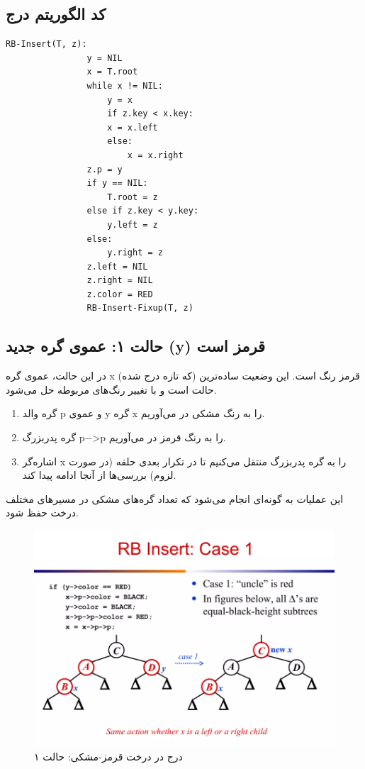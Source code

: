 \documentclass[a4paper,12pt]{article}
\begin{document}
	\subsection*{کد الگوریتم درج}
	
	\begin{LTR}
		\begin{lstlisting}[caption={Red-Black Tree Insertion}, label={lst:rb-insert}]
			RB-Insert(T, z):
				y = NIL
				x = T.root
				while x != NIL:
					y = x
					if z.key < x.key:
					x = x.left
					else:
						x = x.right
				z.p = y
				if y == NIL:
					T.root = z
				else if z.key < y.key:
					y.left = z
				else:
					y.right = z
				z.left = NIL
				z.right = NIL
				z.color = RED
				RB-Insert-Fixup(T, z)
		\end{lstlisting}
	\end{LTR}
	
			\subsection*{حالت ۱: عموی گره جدید (y) قرمز است}
		
		
		در این حالت، عموی گره 
		x
		(که تازه درج شده) قرمز رنگ است. این وضعیت ساده‌ترین حالت است و با تغییر رنگ‌های مربوطه حل می‌شود.
		
		\begin{enumerate}
			\item گره والد 
			p
			و عموی 
			y
			گره 
			x
			را به رنگ مشکی در می‌آوریم.
			\item گره پدربزرگ 
			p−>p
			را به رنگ قرمز در می‌آوریم.
			\item اشاره‌گر 
			x
			را به گره پدربزرگ منتقل می‌کنیم تا در تکرار بعدی حلقه (در صورت لزوم) بررسی‌ها از آنجا ادامه پیدا کند.
		\end{enumerate}
		
		این عملیات به گونه‌ای انجام می‌شود که تعداد گره‌های مشکی در مسیرهای مختلف درخت حفظ شود.
		
		\begin{figure}[h!]
			\centering
			\includegraphics[width=1.1\textwidth]{img/insert-case1.png}
			\caption{درج در درخت قرمز-مشکی: حالت ۱}
		\end{figure}
		
\end{document}
